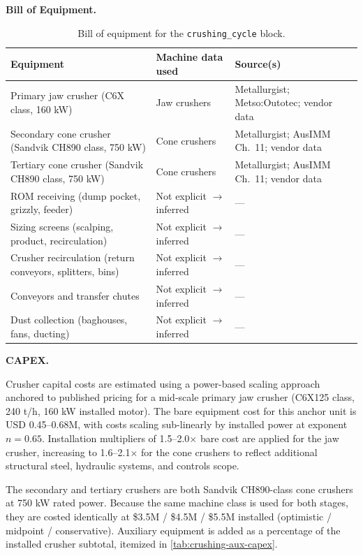 \medskip
\noindent\textbf{Bill of Equipment.}\quad

\begin{table}[h!]
\caption{Bill of equipment for the \texttt{crushing\_cycle} block.}
\centering
\begin{tabular}{>{\raggedright\arraybackslash}p{5.2cm}
				>{\raggedright\arraybackslash}p{4cm}
				>{\raggedright\arraybackslash}p{4.5cm}}
\toprule
\textbf{Equipment} & \textbf{Machine data used} & \textbf{Source(s)} \\
\midrule
Primary jaw crusher (C6X class, 160 kW) & Jaw crushers & 911 Metallurgist; Metso:Outotec; vendor data \\
Secondary cone crusher (Sandvik CH890 class, 750 kW) & Cone crushers & 911 Metallurgist; AusIMM Ch.\ 11; vendor data \\
Tertiary cone crusher (Sandvik CH890 class, 750 kW) & Cone crushers & 911 Metallurgist; AusIMM Ch.\ 11; vendor data \\
ROM receiving (dump pocket, grizzly, feeder) & Not explicit $\rightarrow$ inferred & --- \\
Sizing screens (scalping, product, recirculation) & Not explicit $\rightarrow$ inferred & --- \\
Crusher recirculation (return conveyors, splitters, bins) & Not explicit $\rightarrow$ inferred & --- \\
Conveyors and transfer chutes & Not explicit $\rightarrow$ inferred & --- \\
Dust collection (baghouses, fans, ducting) & Not explicit $\rightarrow$ inferred & --- \\
\bottomrule
\end{tabular}
\end{table}

\clearpage
\medskip
\noindent\textbf{CAPEX.}\quad
 
Crusher capital costs are estimated using a power-based scaling approach anchored to published pricing for a mid-scale primary jaw crusher (C6X125 class, 240 t/h, 160 kW installed motor). The bare equipment cost for this anchor unit is USD 0.45--0.68M, with costs scaling sub-linearly by installed power at exponent $n = 0.65$. Installation multipliers of 1.5--2.0$\times$ bare cost are applied for the jaw crusher, increasing to 1.6--2.1$\times$ for the cone crushers to reflect additional structural steel, hydraulic systems, and controls scope.
 
The secondary and tertiary crushers are both Sandvik CH890-class cone crushers at 750 kW rated power. Because the same machine class is used for both stages, they are costed identically at \$3.5M / \$4.5M / \$5.5M installed (optimistic / midpoint / conservative). Auxiliary equipment is added as a percentage of the installed crusher subtotal, itemized in \ref{tab:crushing-aux-capex}. 
 
